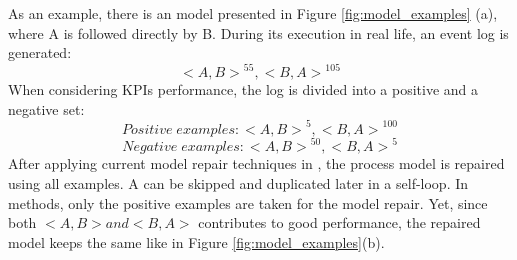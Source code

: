As an example, there is an model presented in Figure \ref{fig:model_examples} (a), where A is followed directly by B. During its execution in real life, an event log is generated: 
\[{ <A, B> }^{55}  , {<B, A>}^{105} \] 
When considering KPIs performance, the  log is divided into a positive and a negative set: 
\[ Positive \;  examples: { <A, B> }^{5}  , {<B, A>}^{100} \] 
\[ Negative \; examples: { <A, B> }^{50}  , {<B, A>}^{5} \]  
After applying current model repair techniques in \cite{fahland2015model}, the process model is repaired using all examples. A can be skipped and duplicated later in a self-loop. In \cite{dees2017enhancing} methods, only the positive examples are taken for the model repair. Yet, since both $<A,B> and <B,A>$ contributes to good performance,  the repaired model keeps the same like in Figure \ref{fig:model_examples}(b).


